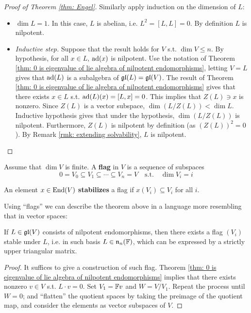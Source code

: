 \documentclass{article}
\begin{document}
\begin{proof}[Proof of Theorem \ref{thm: Engel}]
    Similarly apply induction on the dimension of $L$:
    \begin{itemize}
        \item $\dim L = 1$. In this case, $L$ is abelian, i.e. $L^2 = [L, L] = 0$. By definition $L$ is nilpotent.
        \item \emph{Inductive step.} Suppose that the result holds for $V$ s.t. $\dim V \leq n$. By hypothesis, for all $x \in L$, $\operatorname{ad}(x)$ is nilpotent. Use the notation of Theorem \ref{thm: 0 is eigenvalue of lie algebra of nilpotent endomorphisms}, letting $V = L$ gives that $\operatorname{ad}(L)$ is a subalgebra of $\mathfrak{gl}(L) = \mathfrak{gl}(V)$. The result of Theorem \ref{thm: 0 is eigenvalue of lie algebra of nilpotent endomorphisms} gives that there exists $x \in L$ s.t. $\operatorname{ad}(L)(x) = [L, x] = 0$. This implies that $Z(L) \ni x$ is nonzero. Since $Z(L)$ is a vector subspace, $\dim (L/Z(L)) < \dim L$. Inductive hypothesis gives that under the hypothesis, $\dim (L/Z(L))$ is nilpotent. Furthermore, $Z(L)$ is nilpotent by definition (as $(Z(L))^2 = 0$). By Remark \ref{rmk: extending solvability}, $L$ is nilpotent.
    \end{itemize}
\end{proof}

\begin{definition}[Flag]
    Assume that $\dim V$ is finite. A \textbf{flag} in $V$ is a sequence of subspaces
    \[
        0 = V_0 \subseteq V_1 \subseteq \cdots \subseteq V_n = V \quad \text{s.t.} \quad \dim V_i = i
    \]
\end{definition}
\nogap
\begin{definition}
    An element $x \in \mathrm{End}(V)$ \textbf{stabilizes} a flag if $x(V_i) \subseteq V_i$ for all $i$.
\end{definition}

\textstart
Using ``flags'' we can describe the theorem above in a language more resembling that in vector spaces:

\begin{corollary}
    If $L \in \mathfrak{gl}(V)$ consists of nilpotent endomorphisms, then there exists a flag $(V_i)$ stable under $L$, i.e. in such basis $L \in \mathfrak{n}_n(\mathbb{F})$, which can be expressed by a strictly upper triangular matrix.
\end{corollary}

\begin{proof}
    It suffices to give a construction of such flag. Theorem \ref{thm: 0 is eigenvalue of lie algebra of nilpotent endomorphisms} implies that there exists nonzero $v \in V$ s.t. $L\cdot v = 0$. Set $V_1 = \mathbb{F} v$ and $W = V / V_1$. Repeat the process until $W = 0$; and ``flatten'' the quotient spaces by taking the preimage of the quotient map, and consider the elements as vector subspaces of $V$. 
\end{proof}
\end{document}
